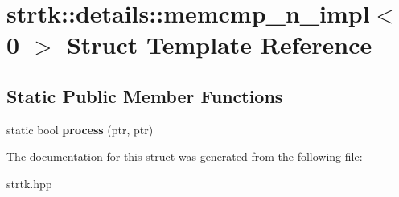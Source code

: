 \hypertarget{structstrtk_1_1details_1_1memcmp__n__impl_3_010_01_4}{\section{strtk\-:\-:details\-:\-:memcmp\-\_\-n\-\_\-impl$<$ 0 $>$ Struct Template Reference}
\label{structstrtk_1_1details_1_1memcmp__n__impl_3_010_01_4}
}
\subsection*{Static Public Member Functions}
\begin{DoxyCompactItemize}
\item 
\hypertarget{structstrtk_1_1details_1_1memcmp__n__impl_3_010_01_4_a34ea2f2acd05e766285b89c2090599d9}{static bool {\bfseries process} (ptr, ptr)}\label{structstrtk_1_1details_1_1memcmp__n__impl_3_010_01_4_a34ea2f2acd05e766285b89c2090599d9}

\end{DoxyCompactItemize}


The documentation for this struct was generated from the following file\-:\begin{DoxyCompactItemize}
\item 
strtk.\-hpp\end{DoxyCompactItemize}
